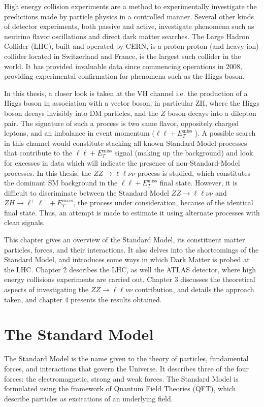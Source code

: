 \documentclass[12pt,a4paper,openright,twoside]{report}
\newcommand{\ZZ}{$ZZ\to \ell\ell\nu\nu$ }
\newcommand{\llM}{$\ell\ell+E_T^{\mathrm{miss}}$ }
\begin{document}
High energy collision experiments are a method to experimentally investigate the predictions made by particle physics in a controlled manner. Several other kinds of detector experiments, both passive and active, investigate phenomena such as neutrino flavor oscillations and direct dark matter searches. The Large Hadron Collider (LHC), built and operated by CERN, is a proton-proton (and heavy ion) collider located in Switzerland and France, is the largest such collider in the world. It has provided invaluable data since commencing operations in 2008, providing experimental confirmation for phenomena such as the Higgs boson.

In this thesis, a closer look is taken at the VH channel i.e. the production of a Higgs boson in association with a vector boson, in particular ZH, where the Higgs boson decays invisibly into DM particles, and the $Z$ boson decays into a dilepton pair. The signature of such a process is two same flavor, oppositely charged leptons, and an imbalance in event momentum (\llM). A possible search in this channel would constitute stacking all known Standard Model processes that contribute to the \llM signal (making up the background) and look for excesses in data which will indicate the presence of non-Standard-Model processes. In this thesis, the \ZZ process is studied, which constitutes the dominant SM background in the \llM final state. However, it is difficult to discriminate between the Standard Model \ZZ and $ZH\to \ell^+\ell^-+E_T^{miss}$, the process under consideration, because of the identical final state. Thus, an attempt is made to estimate it using alternate processes with clean signals. 

This chapter gives an overview of the Standard Model, its constituent matter particles, forces, and their interactions. It also delves into the shortcomings of the Standard Model, and introduces some ways in which Dark Matter is probed at the LHC. Chapter 2 describes the LHC, as well the ATLAS detector, where high energy collisions experiments are carried out. Chapter 3 discusses the theoretical aspects of investigating the \ZZ contribution, and details the approach taken, and chapter 4 presents the results obtained.

\section{The Standard Model}
The Standard Model is the name given to the theory of particles, fundamental forces, and interactions that govern the Universe. It describes three of the four forces: the electromagnetic, strong and weak forces. The Standard Model is formulated using the framework of Quantum Field Theories (QFT), which describe particles as excitations of an underlying field.
\end{document}
